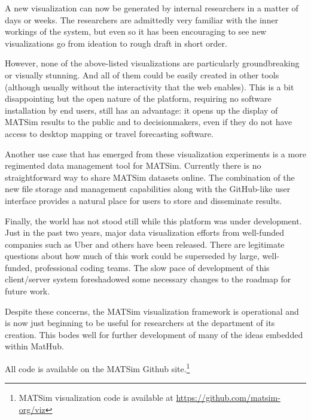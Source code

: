 A new visualization can now be generated by internal researchers in a matter of days or weeks. The researchers are admittedly very familiar with the inner workings of the system, but even so it has been encouraging to see new visualizations go from ideation to rough draft in short order.

However, none of the above-listed visualizations are particularly groundbreaking or visually stunning. And all of them could be easily created in other tools (although usually without the interactivity that the web enables). This is a bit disappointing but the open nature of the platform, requiring no software installation by end users, still has an advantage: it opens up the display of MATSim results to the public and to decisionmakers, even if they do not have access to desktop mapping or travel forecasting software.

Another use case that has emerged from these visualization experiments is a more regimented data management tool for MATSim. Currently there is no straightforward way to share MATSim datasets online. The combination of the new file storage and management capabilities along with the GitHub-like user interface provides a natural place for users to store and disseminate results.

Finally, the world has not stood still while this platform was under development. Just in the past two years, major data visualization efforts from well-funded companies such as Uber and others have been released. There are legitimate questions about how much of this work could be superseded by large, well-funded, professional coding teams. The slow pace of development of this client/server system foreshadowed some necessary changes to the roadmap for future work.

Despite these concerns, the MATSim visualization framework is operational and is now just beginning to be useful for researchers at the department of its creation. This bodes well for further development of many of the ideas embedded within MatHub.

All code is available on the MATSim Github site.\footnote{MATSim visualization code is available at \url{https://github.com/matsim-org/viz}}
